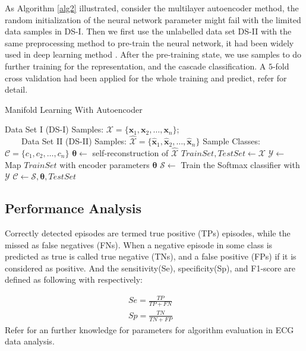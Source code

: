 \documentclass[journal]{IEEEtran}
\begin{document}
As Algorithm \ref{alg2} illustrated, consider the multilayer autoencoder method, the random initialization of the neural network parameter might fail with the limited data samples in DS-I. Then we first use the unlabelled data set DS-II with the same preprocessing method to pre-train the neural network, it had been widely used in deep learning method \cite{vincent2010stacked, goodfellow2016deep}. 
After the pre-training state, we use samples to do further training for the representation, and the cascade classification.
A $5$-fold cross validation had been applied for the whole training and predict, refer \cite{kohavi1995study} for detail.


\begin{algorithm}
 \caption{Manifold Learning With Autoencoder}
 \label{alg2}
 \begin{algorithmic}
 \REQUIRE Data Set I (DS-I) Samples: $ \mathcal{X} = \{\bm{x}_1, \bm{x}_2, \ldots, \bm{x}_n\}$; \\$\quad \quad $Data Set II (DS-II) Samples: $\hat{\mathcal{X}} = \{\bm{\hat{x}}_1, \bm{\hat{x}}_2, \ldots, \bm{\hat{x}}_n\}$
 \ENSURE Sample Classes: $\mathcal{C} = \{c_1, c_2, \ldots, c_n\}$
 \STATE $\bm{\theta} \leftarrow $ self-reconstruction of $\mathcal{\hat{X}}$
  \STATE $TrainSet, TestSet \leftarrow \mathcal{X}$
  \STATE $\mathcal{Y} \leftarrow$ Map $TrainSet$ with encoder parameters $\bm{\theta}$ 
 \STATE $\mathcal{S} \leftarrow$ Train the Softmax classifier with $\mathcal{Y}$
 \STATE $\mathcal{C} \leftarrow \mathcal{S}, \bm{\theta}, TestSet$
  \end{algorithmic}
 \end{algorithm}

 


%
%

\subsection{Performance Analysis}
Correctly detected episodes are termed true positive (TPs) episodes, while the missed as false negatives (FNs).
When a negative episode in some class is predicted as true is called true negative (TNs), and a false positive (FPs) if it is considered as positive. And the sensitivity(Se), specificity(Sp), and F1-score are defined as following with respectively:

\begin{equation}
\begin{split}
Se = \frac{TP}{TP+FN} \quad \\
 Sp = \frac{TN}{TN+FP}
\end{split}
\end{equation}
Refer \cite{mar} for an further knowledge for parameters for algorithm evaluation in ECG data analysis.
\end{document}
